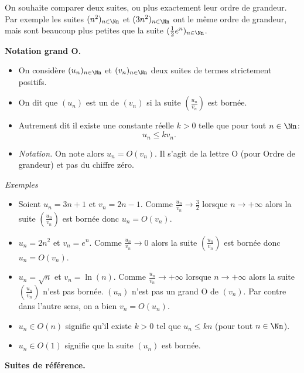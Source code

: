 \documentclass[11pt,class=report,crop=false]{standalone}
\begin{document}
\begin{cours}
On souhaite comparer deux suites, ou plus exactement leur ordre de grandeur. Par exemple les suites $(n^2)_{n\in\Nn}$ et $(3n^2)_{n\in\Nn}$ ont le même ordre de grandeur, mais sont beaucoup plus petites que la suite $(\frac12 e^n)_{n\in\Nn}$. 

\textbf{Notation \og{}grand O\fg{}.}
\begin{itemize}
	\item On considère $(u_n)_{n\in\Nn}$ et $(v_n)_{n\in\Nn}$ deux suites de termes strictement positifs.
	\item On dit que $(u_n)$ est un  de $(v_n)$ si la suite $\left(\frac{u_n}{v_n}\right)$ est bornée.
    \item Autrement dit il existe une constante réelle $k>0$ telle que pour tout $n\in \Nn$:
$$u_n \le k v_n.$$
    \item \emph{Notation.} On note alors $u_n = O(v_n)$. Il s'agit de la lettre \og{}O\fg{} (pour Ordre de grandeur) et pas du chiffre zéro.
\end{itemize}

\emph{Exemples} 
\begin{itemize}
	\item Soient $u_n = 3n+1$ et $v_n = 2n-1$. Comme $\frac{u_n}{v_n} \to \frac{3}{2}$ lorsque $n\to+\infty$ alors la suite $\left(\frac{u_n}{v_n}\right)$ est bornée donc $u_n = O(v_n)$.
	
	\item $u_n = 2n^2$ et $v_n = e^n$. Comme $\frac{u_n}{v_n} \to 0$ alors la suite $\left(\frac{u_n}{v_n}\right)$ est bornée donc $u_n = O(v_n)$. 
	
	\item $u_n = \sqrt{n}$ et $v_n = \ln(n)$. Comme $\frac{u_n}{v_n} \to +\infty$ lorsque $n\to+\infty$ alors la suite $\left(\frac{u_n}{v_n}\right)$ n'est pas bornée.  $(u_n)$ n'est pas un grand O de $(v_n)$.  Par contre dans l'autre sens, on a bien $v_n = O(u_n)$.
	
	\item $u_n \in O(n)$ signifie qu'il existe $k>0$ tel que $u_n \le kn$ (pour tout $n\in\Nn$).
	
	\item $u_n \in O(1)$ signifie que la suite $(u_n)$ est bornée.
		
\end{itemize}

\bigskip

\textbf{Suites de référence.}


\end{cours}
\end{document}
